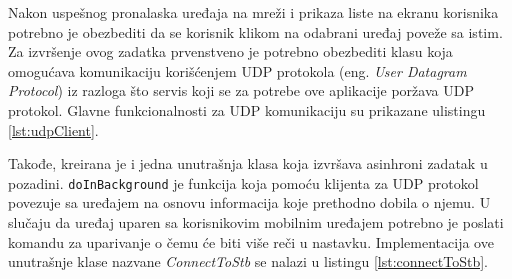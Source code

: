 \documentclass[struktura.tex]{subfiles}
\begin{document}
Nakon uspešnog pronalaska uređaja na mreži i prikaza liste na ekranu korisnika potrebno je obezbediti da se korisnik klikom na odabrani uređaj poveže sa istim. Za izvršenje ovog zadatka prvenstveno je potrebno obezbediti klasu koja omogućava komunikaciju korišćenjem UDP protokola (eng. \textit{User Datagram Protocol}) iz razloga što servis koji se za potrebe ove aplikacije poržava UDP protokol. Glavne funkcionalnosti za UDP komunikaciju su prikazane ulistingu  \ref{lst:udpClient}.




Takođe, kreirana je i jedna unutrašnja klasa koja izvršava asinhroni zadatak u pozadini. \verb|doInBackground| je funkcija koja pomoću klijenta za UDP protokol povezuje sa uređajem na osnovu informacija koje prethodno dobila o njemu. U slučaju da uređaj uparen sa korisnikovim mobilnim uređajem potrebno je poslati komandu za uparivanje o čemu će biti više reči u nastavku. Implementacija ove unutrašnje klase nazvane \textit{ConnectToStb} se nalazi u listingu \ref{lst:connectToStb}.


\end{document}

